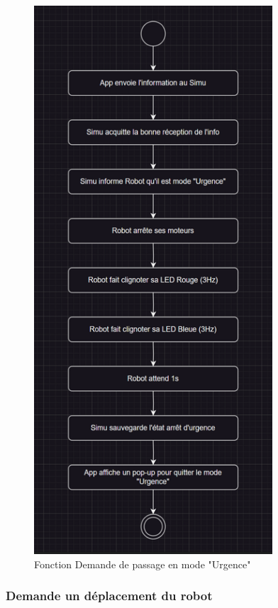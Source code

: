 \begin{figure}[H]
    \centering
    \includegraphics[scale=0.25]{data/function1.png}
    \caption{Fonction Demande de passage en mode "Urgence"}
    \label{fig:ihm_emergency}
    \end{figure}

\subsubsection{Demande un déplacement du robot}


